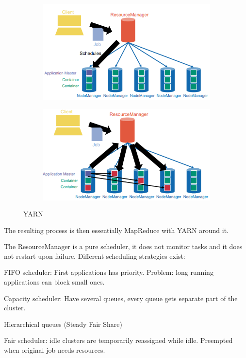 \documentclass[11pt,oneside,a4paper]{article}
\begin{document}
\begin{figure}[hb!]
	\centering
	\begin{subfigure}[t]{.5\textwidth}
		\centering
		\includegraphics[width=0.8\linewidth]{figures/yarn_1}
		\label{fig:yarn1}
	\end{subfigure}%
	\begin{subfigure}[t]{.5\textwidth}
		\centering
		\includegraphics[width=0.8\linewidth]{figures/yarn_2}
		\label{fig:yarn2}
	\end{subfigure}
	\caption{YARN}
\end{figure}

The resulting process is then essentially MapReduce with YARN around it.

The ResourceManager is a pure scheduler, it does not monitor tasks and it does not restart upon failure. Different scheduling strategies exist:

\begin{compactitem}
\item FIFO scheduler: First applications has priority. Problem: long running applications can block small ones.
\item Capacity scheduler: Have several queues, every queue gets separate part of the cluster.
\item Hierarchical queues (Steady Fair Share)
\item Fair scheduler: idle clusters are temporarily reassigned while idle. Preempted when original job needs resources. 
\end{compactitem}
\end{document}
